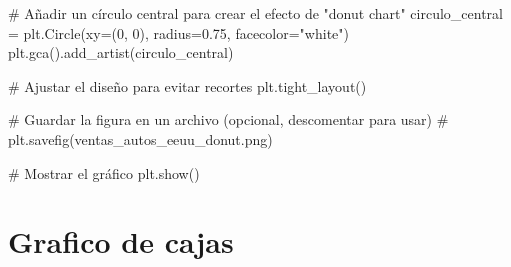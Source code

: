 \documentclass[
  jou,
  floatsintext,
  longtable,
  a4paper,
  nolmodern,
  notxfonts,
  notimes,
  colorlinks=true,linkcolor=blue,citecolor=blue,urlcolor=blue]{apa7}
\newenvironment{Shaded}{\begin{snugshade}}{\end{snugshade}}
\newcommand{\CommentTok}[1]{\textcolor[rgb]{0.37,0.37,0.37}{#1}}
\newcommand{\DecValTok}[1]{\textcolor[rgb]{0.68,0.00,0.00}{#1}}
\newcommand{\FloatTok}[1]{\textcolor[rgb]{0.68,0.00,0.00}{#1}}
\newcommand{\NormalTok}[1]{\textcolor[rgb]{0.00,0.23,0.31}{#1}}
\newcommand{\OperatorTok}[1]{\textcolor[rgb]{0.37,0.37,0.37}{#1}}
\newcommand{\StringTok}[1]{\textcolor[rgb]{0.13,0.47,0.30}{#1}}
\begin{document}
\begin{Shaded}
\begin{Highlighting}[]
\CommentTok{\# Añadir un círculo central para crear el efecto de "donut chart"}
\NormalTok{circulo\_central }\OperatorTok{=}\NormalTok{ plt.Circle(xy}\OperatorTok{=}\NormalTok{(}\DecValTok{0}\NormalTok{, }\DecValTok{0}\NormalTok{), radius}\OperatorTok{=}\FloatTok{0.75}\NormalTok{, facecolor}\OperatorTok{=}\StringTok{"white"}\NormalTok{)}
\NormalTok{plt.gca().add\_artist(circulo\_central)}

\CommentTok{\# Ajustar el diseño para evitar recortes}
\NormalTok{plt.tight\_layout()}

\CommentTok{\# Guardar la figura en un archivo (opcional, descomentar para usar)}
\CommentTok{\# plt.savefig(\textquotesingle{}ventas\_autos\_eeuu\_donut.png\textquotesingle{})}

\CommentTok{\# Mostrar el gráfico}
\NormalTok{plt.show()}
\end{Highlighting}
\end{Shaded}

\section{Grafico de cajas}\label{grafico-de-cajas}
\end{document}
